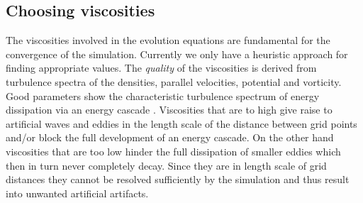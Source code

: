 \documentclass[master.tex]{subfiles}
\begin{document}
\subsection{Choosing viscosities}
The viscosities involved in the evolution equations are fundamental for the convergence of the simulation. Currently we only have a heuristic approach for finding appropriate values.\newline
The \textit{quality} of the viscosities is derived from turbulence spectra of the densities, parallel velocities, potential and vorticity. Good parameters show the characteristic turbulence spectrum of energy dissipation via an energy cascade \cite{TurbulentSpectra}.\newline
Viscosities that are to high give raise to artificial waves and eddies in the length scale of the distance between grid points and/or block the full development of an energy cascade. On the other hand viscosities that are too low hinder the full dissipation of smaller eddies which then in turn never completely decay. Since they are in length scale of grid distances they cannot be resolved sufficiently by the simulation and thus result into unwanted artificial artifacts.
\end{document}
